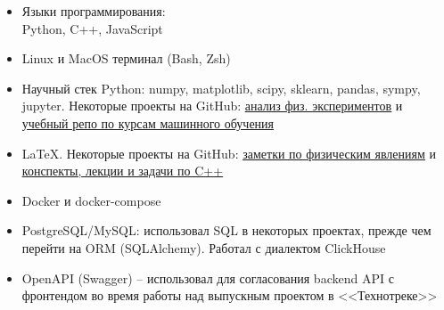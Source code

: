 \begin{itemize}
	\item Языки программирования: \\ 
	Python, C++, JavaScript
	\item Linux и MacOS терминал (Bash, Zsh)
	\item Научный стек Python:
	numpy, matplotlib, scipy, sklearn, pandas, sympy, jupyter. Некоторые проекты на GitHub: \href{https://github.com/alekseik1/phys\_labs}{\underline{анализ физ. экспериментов}} и \href{https://github.com/alekseik1/machine\_learning\_coursera}{\underline{учебный репо по курсам машинного обучения}}
	\item LaTeX. Некоторые проекты на GitHub: \href{https://github.com/alekseik1/quest\_on\_choice}{\underline{заметки по физическим явлениям}} и \href{https://github.com/alekseik1/cpp\_mipt\_study}{\underline{конспекты, лекции и задачи по C++}}
    \item Docker и docker-compose
    \item PostgreSQL/MySQL: использовал SQL в некоторых проектах, прежде чем перейти на ORM (SQLAlchemy). Работал с диалектом ClickHouse
    \item OpenAPI (Swagger) -- использовал для согласования backend API с фронтендом во время работы над выпускным проектом в <<Технотреке>>
\end{itemize}








